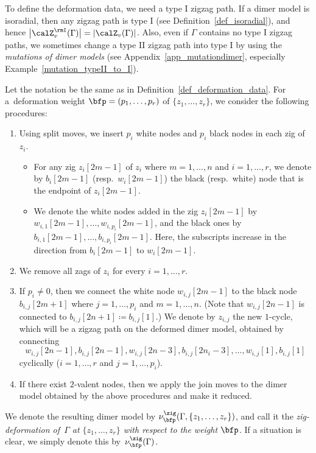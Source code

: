 \begin{Remark}\label{rem_typeI_to_typeII}
To define the deformation data, we need a type I zigzag path.
If a dimer model is isoradial, then any zigzag path is type I (see Definition~\ref{def_isoradial}), and hence $\big|\calZ_v^\rmI(\Gamma)\big|=|\calZ_v(\Gamma)|$.
Also, even if $\Gamma$ contains no type I zigzag paths, we sometimes change a type II zigzag path into type I by using the \emph{mutations of dimer models}
(see Appendix~\ref{app_mutationdimer}, especially Example~\ref{mutation_typeII_to_I}).
\end{Remark}

\begin{Definition}\label{def_deformation_zig}
Let the notation be the same as in Definition~\ref{def_deformation_data}.
For a~deformation weight $\bfp=(p_1,\dots,p_r)$ of $\{z_1, \dots, z_r\}$, we consider the following procedures:
\begin{enumerate}
\setlength{\parskip}{0pt}\itemsep=0pt
\item Using split moves, we insert $p_i$ white nodes and $p_i$ black nodes in each zig of $z_i$.

\noindent{\bf [Notation]}
\begin{itemize}\itemsep=0pt
\item For any zig $z_i[2m-1]$ of $z_i$ where $m=1,\dots,n$ and $i=1,\dots,r$, we denote by $b_i[2m-1]$ (resp.~$w_i[2m-1]$) the black (resp.\ white) node that is the endpoint of $z_i[2m-1]$.
\item We denote the white nodes added in the zig $z_i[2m-1]$ by $w_{i,1}[2m-1],\dots,w_{i,p_i}[2m-1]$, and the black ones by $b_{i,1}[2m-1],\dots,b_{i,p_i}[2m-1]$.
Here, the subscripts increase in the direction from $b_i[2m-1]$ to $w_i[2m-1]$.
\end{itemize}
\item We remove all zags of $z_i$ for every $i=1,\dots,r$.
\item If $p_i\neq 0$, then we connect the white node $w_{i,j}[2m-1]$ to the black node $b_{i,j}[2m+1]$ where $j=1,\dots,p_i$ and $m=1,\dots,n$.
(Note that $w_{i,j}[2n-1]$ is connected to $b_{i,j}[2n+1]\coloneqq b_{i,j}[1]$.)
We denote by $z_{i,j}$ the new $1$-cycle, which will be a zigzag path on the deformed dimer model, obtained by connecting
\begin{displaymath}
w_{i,j}[2n-1], b_{i,j}[2n-1], w_{i,j}[2n-3], b_{i,j}[2n_i-3],\dots,w_{i,j}[1], b_{i,j}[1]
\end{displaymath}
cyclically ($i=1,\dots,r$ and $j=1,\dots,p_i$).
\item[(join)] If there exist $2$-valent nodes, then we apply the join moves to the dimer model obtained by the above procedures and make it reduced.
\end{enumerate}
We denote the resulting dimer model by $\nu^\zig_\bfp(\Gamma, \{z_1,\dots,z_r\})$,
and call it the \emph{zig-deformation of~$\Gamma$ at $\{z_1,\dots,z_r\}$ with respect to the weight $\bfp$}.
If a situation is clear, we simply denote this by~$\nu^\zig_\bfp(\Gamma)$.
\end{Definition}

